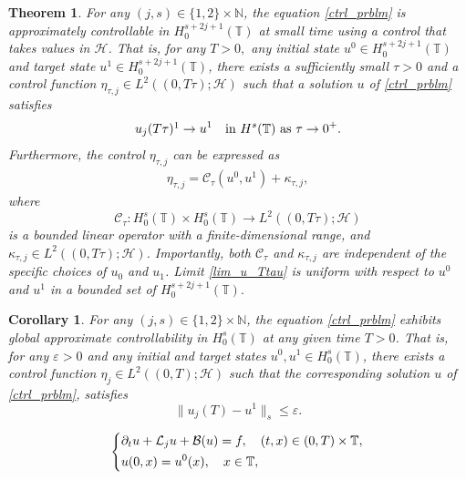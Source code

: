 \documentclass[10pt,a4paper]{amsart}
\newtheorem{theorem}{Theorem}
\newtheorem{corollary}{Corollary}
\begin{document}
\begin{theorem}\label{main_thm}
	For any \( (j, s) \in \{1, 2\} \times \mathbb{N} \), the equation \eqref{ctrl_prblm} is approximately controllable in $H^{s+ 2j + 1}_0(\mathbb{T})$ at small time using a control that takes values in \( \mathcal{H} \). That is, for any $T > 0, $ any initial state \( u^0 \in H^{s+ 2j + 1}_0(\mathbb{T}) \) and target state \( u^1 \in H^{s+ 2j + 1}_0(\mathbb{T}) \), there exists a sufficiently small \( \tau > 0 \) and a control function \( \eta_{\tau, j} \in L^2((0, T\tau); \mathcal{H}) \) such that a solution \( u \) of \eqref{ctrl_prblm} satisfies  
	\begin{align}\label{lim_u_Ttau}  
		u_j(T \tau)\footnotemark \to u^1 \quad \text{in } H^s(\mathbb{T}) \text{ as } \tau \to 0^+.  
	\end{align}  
	Furthermore, the control \( \eta_{\tau, j} \) can be expressed as  
	\begin{align}\label{form_of_ctrl}  
		\eta_{\tau, j} = \mathcal{C}_{\tau}(u^0, u^1) + \kappa_{\tau, j},  
	\end{align}  
	where  
	\[
	\mathcal{C}_{\tau}: H^s_0(\mathbb{T}) \times H^s_0(\mathbb{T}) \to L^2((0, T\tau); \mathcal{H})  
	\]  
	is a bounded linear operator with a finite-dimensional range, and \( \kappa_{\tau, j} \in L^2((0, T\tau); \mathcal{H}) \). Importantly, both \( \mathcal{C}_{\tau} \) and \( \kappa_{\tau, j} \) are independent of the specific choices of \( u_0 \) and \( u_1 \). Limit \eqref{lim_u_Ttau} is uniform with respect to $u^0$ and $u^1$ in a bounded set of $H^{s+ 2j + 1}_0(\mathbb{T}).$
\end{theorem}

\begin{corollary}\label{Coro_to_cnclude_main_result}  
	For any \( (j, s) \in \{1, 2\} \times \mathbb{N} \), the equation \eqref{ctrl_prblm} exhibits global approximate controllability in \( H^s_0(\mathbb{T}) \) at any given time \( T > 0 \). That is, for any \( \varepsilon > 0 \) and any initial and target states \( u^0, u^1 \in H^s_0(\mathbb{T}) \), there exists a control function \( \eta_j \in L^2((0, T); \mathcal{H}) \) such that the corresponding solution \( u \) of \eqref{ctrl_prblm}, satisfies  
	\[
	\|u_j(T) - u^1 \|_{s} \leq \varepsilon.
	\]  
\end{corollary}

\begin{align}\label{diff_form_ctrl_prblm}  
	\begin{dcases}  
		\partial_t u + \mathcal{L}_j u + \mathcal{B}(u) = f, \quad (t, x) \in (0, T) \times \mathbb{T}, \\  
		u(0, x) = u^0 (x), \quad x \in \mathbb{T},  
	\end{dcases}  
\end{align}  
\end{document}
